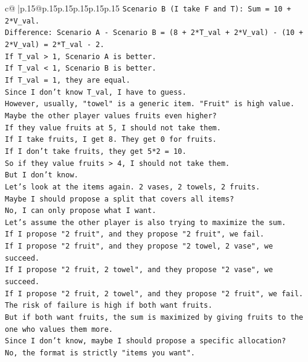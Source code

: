 \documentclass{article}
\begin{document}
{\begin{supertabular}{c@{$\;$}|p{.15\linewidth}@{}p{.15\linewidth}p{.15\linewidth}p{.15\linewidth}p{.15\linewidth}p{.15\linewidth}}
{{{\texttt{Scenario B (I take F and T): Sum = 10 + 2*V\_val.} \\
\texttt{Difference: Scenario A {-} Scenario B = (8 + 2*T\_val + 2*V\_val) {-} (10 + 2*V\_val) = 2*T\_val {-} 2.} \\
\texttt{If T\_val > 1, Scenario A is better.} \\
\texttt{If T\_val < 1, Scenario B is better.} \\
\texttt{If T\_val = 1, they are equal.} \\
\texttt{Since I don't know T\_val, I have to guess.} \\
\texttt{However, usually, "towel" is a generic item. "Fruit" is high value.} \\
\texttt{Maybe the other player values fruits even higher?} \\
\texttt{If they value fruits at 5, I should not take them.} \\
\texttt{If I take fruits, I get 8. They get 0 for fruits.} \\
\texttt{If I don't take fruits, they get 5*2 = 10.} \\
\texttt{So if they value fruits > 4, I should not take them.} \\
\texttt{But I don't know.} \\
\texttt{Let's look at the items again. 2 vases, 2 towels, 2 fruits.} \\
\texttt{Maybe I should propose a split that covers all items?} \\
\texttt{No, I can only propose what I want.} \\
\texttt{Let's assume the other player is also trying to maximize the sum.} \\
\texttt{If I propose "2 fruit", and they propose "2 fruit", we fail.} \\
\texttt{If I propose "2 fruit", and they propose "2 towel, 2 vase", we succeed.} \\
\texttt{If I propose "2 fruit, 2 towel", and they propose "2 vase", we succeed.} \\
\texttt{If I propose "2 fruit, 2 towel", and they propose "2 fruit", we fail.} \\
\texttt{The risk of failure is high if both want fruits.} \\
\texttt{But if both want fruits, the sum is maximized by giving fruits to the one who values them more.} \\
\texttt{Since I don't know, maybe I should propose a specific allocation?} \\
\texttt{No, the format is strictly "items you want".} \\
}}}
\end{supertabular}}
\end{document}
